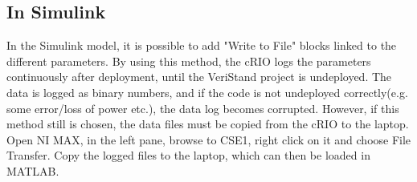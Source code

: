 \documentclass[a4paper,english]{report}
\begin{document}
\subsection{In Simulink}
In the Simulink model, it is possible to add "Write to File" blocks linked to the different parameters. By using this method, the cRIO logs the parameters continuously after deployment, until the VeriStand project is undeployed. The data is logged as binary numbers, and if the code is not undeployed correctly(e.g. some error/loss of power etc.), the data log becomes corrupted. However, if this method still is chosen, the data files must be copied from the cRIO to the laptop. Open NI MAX, in the left pane, browse to CSE1, right click on it and choose File Transfer. Copy the logged files to the laptop, which can then be loaded in MATLAB. 
\clearpage



\end{document}
